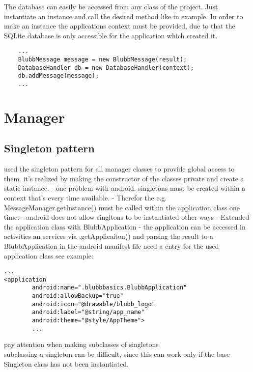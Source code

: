 \documentclass[12pt,a4paper,oneside]{report}
\begin{document}
The database can easily be accessed from any class of the project. Just instantiate an instance and call the desired method like in example. In order to make an instance the applications context must be provided, due to that the SQLite database is only accessible for the application which created it.
\begin{lstlisting}
	...
	BlubbMessage message = new BlubbMessage(result);
	DatabaseHandler db = new DatabaseHandler(context);
	db.addMessage(message);
	...
\end{lstlisting}


\section{Manager}

\subsection{Singleton pattern}
used the singleton pattern for all manager classes to provide global access to them. it's realized by making the constructor of the classes private and create a static instance. 
\citep[p. 39]{cooper2000java}
- one problem with android. singletons must be created within a context that's every time available.
- Therefor the e.g. MessageManager.getInstance() must be called within the application class one time. 
- android does not allow singltons to be instantiated other ways 
- Extended the application class with BlubbApplication
- the application can be accessed in activities an services via .getApplicaiton() and parsing the result to a BlubbApplication
in the android manifest file need a entry for the used application class see example:

\lstset{language=xml}
\begin{lstlisting}
...
<application
        android:name=".blubbbasics.BlubbApplication"
        android:allowBackup="true"
        android:icon="@drawable/blubb_logo"
        android:label="@string/app_name"
        android:theme="@style/AppTheme">
        ...
\end{lstlisting}
\lstset{language=java}
pay attention when making subclasses of singletons
\\subclassing a singleton can be difficult, since this can work only if the base Singleton class has not been instantiated. \citep[p. 46]{cooper2000java} 
\end{document}

